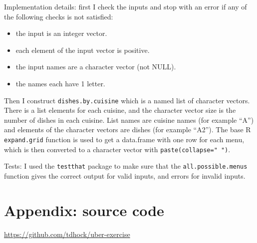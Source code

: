 \documentclass{article}
\begin{document}
Implementation details: first I check the inputs and stop with an
error if any of the following checks is not satisfied:
\begin{itemize}
\item the input is an integer vector.
\item each element of the input vector is positive.
\item the input names are a character vector (not NULL).
\item the names each have 1 letter.
\end{itemize}
Then I construct \texttt{dishes.by.cuisine} which is a named list of
character vectors. There is a list elements for each
cuisine, and the character vector size is the number of
dishes in each cuisine. List names are cuisine names (for example
``A'') and elements of the character vectors are dishes (for example
``A2'').  The base R \texttt{expand.grid} function is used to get a
data.frame with one row for each menu, which is then converted to a
character vector with \texttt{paste(collapse=" ")}.

Tests: I used the \texttt{testthat} package to make sure that the
\texttt{all.possible.menus} function gives the correct output for
valid inputs, and errors for invalid inputs.

\section{Appendix: source code}

\url{https://github.com/tdhock/uber-exercise}
\end{document}
